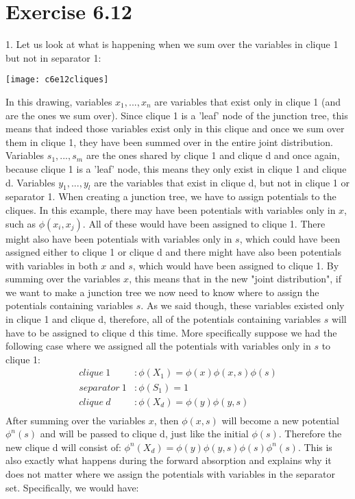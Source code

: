 \documentclass[11pt,a4paper,oneside]{report}
\begin{document}
\section*{Exercise 6.12}

1. Let us look at what is happening when we sum over the variables in clique 1 but not in separator 1:

	\begin{center} \texttt{[image: c6e12cliques]}\end{center}  
	
	In this drawing, variables $x_1,...,x_n$ are variables that exist only in clique 1 (and are the ones we sum over). Since clique 1 is a 'leaf' node of the junction tree, this means that indeed those variables exist only in this clique and once we sum over them in clique 1, they have been summed over in the entire joint distribution. Variables $s_1,...,s_m$ are the ones shared by clique 1 and clique d and once again, because clique 1 is a 'leaf' node, this means they only exist in clique 1 and clique d. Variables $y_1,...,y_l$ are the variables that exist in clique d, but not in clique 1 or separator 1. When creating a junction tree, we have to assign potentials to the cliques. In this example, there may have been potentials with variables only in $x$, such as $\phi(x_i,x_j)$. All of these would have been assigned to clique 1. There might also have been potentials with variables only in $s$, which could have been assigned either to clique 1 or clique d and there might have also been potentials with variables 
in both $x$ and $s$, which would have been assigned to clique 1. By summing over the variables $x$, this means that in the new "joint distribution", if we want to make a junction tree we now need to know where to assign the potentials containing variables $s$. As we said though, these variables existed only in clique 1 and clique d, therefore, all of the potentials containing variables $s$ will have to be assigned to clique d this time. More specifically suppose we had the following case where we assigned all the potentials with variables only in $s$ to clique 1:
	\begin{align*}
	clique\ 1&:\phi(X_1) = \phi(x)\phi(x,s)\phi(s)\\
	separator\ 1&:\phi(S_1) = 1\\
	clique\ d&:\phi(X_d) = \phi(y)\phi(y,s)\\
	\end{align*}
	After summing over the variables $x$, then $\phi(x,s)$ will become a new potential $\phi^n(s)$ and will be passed to clique d, just like the initial $\phi(s)$. Therefore the new clique d will consist of: $\phi^n(X_d)=\phi(y)\phi(y,s)\phi(s)\phi^n(s)$. This is also exactly what happens during the forward absorption and explains why it does not matter where we assign the potentials with variables in the separator set. Specifically, we would have:
\end{document}
